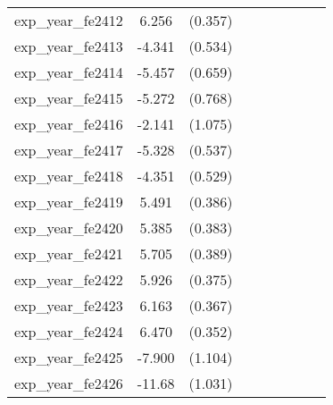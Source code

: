 {\begin{tabular}{l*{4}{cc}}
exp\_year\_fe2412&    6.256\sym{***}&  (0.357)&                  &         &                  &         &                  &         \\
exp\_year\_fe2413&   -4.341\sym{***}&  (0.534)&                  &         &                  &         &                  &         \\
exp\_year\_fe2414&   -5.457\sym{***}&  (0.659)&                  &         &                  &         &                  &         \\
exp\_year\_fe2415&   -5.272\sym{***}&  (0.768)&                  &         &                  &         &                  &         \\
exp\_year\_fe2416&   -2.141\sym{*}  &  (1.075)&                  &         &                  &         &                  &         \\
exp\_year\_fe2417&   -5.328\sym{***}&  (0.537)&                  &         &                  &         &                  &         \\
exp\_year\_fe2418&   -4.351\sym{***}&  (0.529)&                  &         &                  &         &                  &         \\
exp\_year\_fe2419&    5.491\sym{***}&  (0.386)&                  &         &                  &         &                  &         \\
exp\_year\_fe2420&    5.385\sym{***}&  (0.383)&                  &         &                  &         &                  &         \\
exp\_year\_fe2421&    5.705\sym{***}&  (0.389)&                  &         &                  &         &                  &         \\
exp\_year\_fe2422&    5.926\sym{***}&  (0.375)&                  &         &                  &         &                  &         \\
exp\_year\_fe2423&    6.163\sym{***}&  (0.367)&                  &         &                  &         &                  &         \\
exp\_year\_fe2424&    6.470\sym{***}&  (0.352)&                  &         &                  &         &                  &         \\
exp\_year\_fe2425&   -7.900\sym{***}&  (1.104)&                  &         &                  &         &                  &         \\
exp\_year\_fe2426&   -11.68\sym{***}&  (1.031)&                  &         &                  &         &                  &         \\

\end{tabular}}
